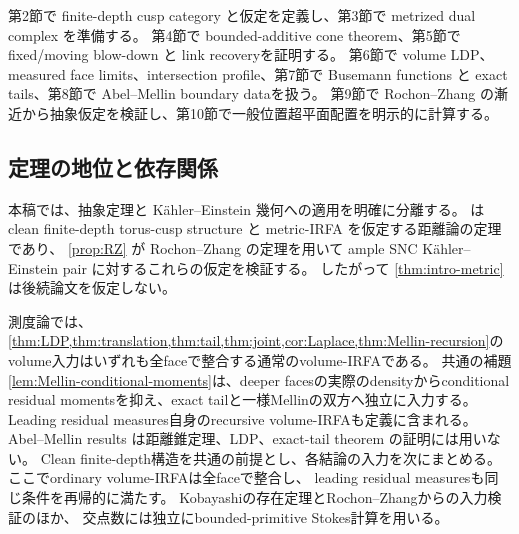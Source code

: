 \documentclass[11pt,a4paper]{ltjsarticle}
\theoremstyle{plain}
\theoremstyle{definition}
\theoremstyle{remark}
\begin{document}
第2節で finite-depth cusp category と仮定を定義し、第3節で metrized dual complex を準備する。
第4節で bounded-additive cone theorem、第5節で fixed/moving blow-down と link recoveryを証明する。
第6節で volume LDP、measured face limits、intersection profile、第7節で Busemann functions と exact tails、第8節で Abel--Mellin boundary dataを扱う。
第9節で Rochon--Zhang の漸近から抽象仮定を検証し、第10節で一般位置超平面配置を明示的に計算する。

\subsection{定理の地位と依存関係}
本稿では、抽象定理と K\"ahler--Einstein 幾何への適用を明確に分離する。
 は clean finite-depth torus-cusp structure と metric-IRFA を仮定する距離論の定理であり、
\cref{prop:RZ} が Rochon--Zhang の定理を用いて ample SNC K\"ahler--Einstein pair に対するこれらの仮定を検証する。
したがって \cref{thm:intro-metric} は後続論文を仮定しない。

測度論では、\cref{thm:LDP,thm:translation,thm:tail,thm:joint,cor:Laplace,thm:Mellin-recursion}のvolume入力はいずれも全faceで整合する通常のvolume-IRFAである。
共通の補題\ref{lem:Mellin-conditional-moments}は、deeper facesの実際のdensityからconditional residual momentsを抑え、exact tailと一様Mellinの双方へ独立に入力する。
Leading residual measures自身のrecursive volume-IRFAも定義に含まれる。
Abel--Mellin results は距離錐定理、LDP、exact-tail theorem の証明には用いない。
Clean finite-depth構造を共通の前提とし、各結論の入力を次にまとめる。
ここでordinary volume-IRFAは全faceで整合し、
leading residual measuresも同じ条件を再帰的に満たす。
Kobayashiの存在定理とRochon--Zhangからの入力検証のほか、
交点数には独立にbounded-primitive Stokes計算を用いる。
\end{document}
